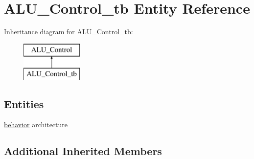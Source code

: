 \hypertarget{class_a_l_u___control__tb}{\section{A\-L\-U\-\_\-\-Control\-\_\-tb Entity Reference}
\label{class_a_l_u___control__tb}
}
Inheritance diagram for A\-L\-U\-\_\-\-Control\-\_\-tb\-:\begin{figure}[H]
\begin{center}
\leavevmode
\includegraphics[height=2.000000cm]{class_a_l_u___control__tb}
\end{center}
\end{figure}
\subsection*{Entities}
\begin{DoxyCompactItemize}
\item 
\hyperlink{class_a_l_u___control__tb_1_1behavior}{behavior} architecture
\end{DoxyCompactItemize}
\subsection*{Additional Inherited Members}
